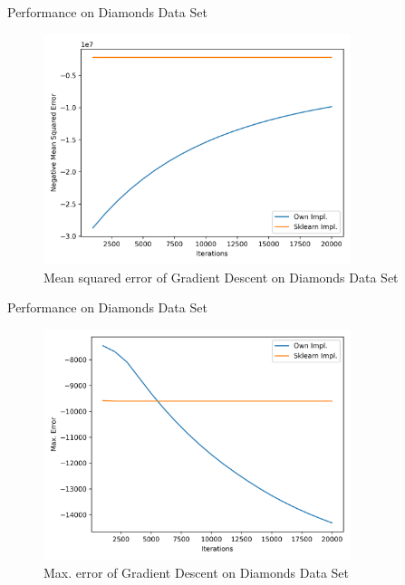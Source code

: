 \documentclass[10pt]{beamer}
\begin{document}
    \begin{frame}{Performance on Diamonds Data Set}
        \begin{figure}[h!]
            \centering
            \includegraphics[width=0.8\textwidth]{exercise_2/presentation/figures/diamond_scores_mean_sq_err.png}
            \caption{Mean squared error of Gradient Descent on Diamonds Data Set}
            \label{fig:Grad_Diamond_MSE}
       \end{figure}
    \end{frame}
    
    \begin{frame}{Performance on Diamonds Data Set}
        \begin{figure}[h!]
            \centering
            \includegraphics[width=0.8\textwidth]{exercise_2/presentation/figures/diamond_scores_max_error.png}
            \caption{Max. error of Gradient Descent on Diamonds Data Set}
            \label{fig:Grad_Diamond_max-error}
       \end{figure}
    \end{frame}
    
\end{document}
